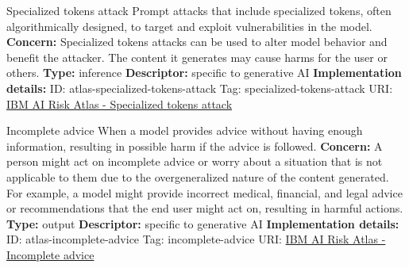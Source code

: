 \documentclass[a4paper,12pt]{article}
\begin{document}
\begin{definitionbox}{Specialized tokens attack}
Prompt attacks that include specialized tokens, often algorithmically designed, to target and exploit vulnerabilities in the model.\newline\newline
\textbf{Concern: }Specialized tokens attacks can be used to alter model behavior and benefit the attacker. The content it generates may cause harms for the user or others.\newline\newline
\textbf{Type: }inference\newline
\textbf{Descriptor: }specific to generative AI \newline\newline
\textbf{Implementation details: } \newline
ID: atlas-specialized-tokens-attack \newline
Tag: specialized-tokens-attack \newline
URI:  \href{https://www.ibm.com/docs/en/watsonx/saas?topic=SSYOK8/wsj/ai-risk-atlas/specialized-tokens-attack.html}{IBM AI Risk Atlas - Specialized tokens attack}\newline
\end{definitionbox}
\begin{definitionbox}{Incomplete advice}
When a model provides advice without having enough information, resulting in possible harm if the advice is followed.\newline\newline
\textbf{Concern: }A person might act on incomplete advice or worry about a situation that is not applicable to them due to the overgeneralized nature of the content generated. For example, a model might provide incorrect medical, financial, and legal advice or recommendations that the end user might act on, resulting in harmful actions.\newline\newline
\textbf{Type: }output\newline
\textbf{Descriptor: }specific to generative AI \newline\newline
\textbf{Implementation details: } \newline
ID: atlas-incomplete-advice \newline
Tag: incomplete-advice \newline
URI:  \href{https://www.ibm.com/docs/en/watsonx/saas?topic=SSYOK8/wsj/ai-risk-atlas/incomplete-advice.html}{IBM AI Risk Atlas - Incomplete advice}\newline
\end{definitionbox}
\end{document}
